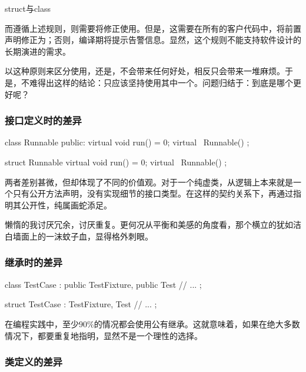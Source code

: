 \begin{content}
\begin{episode}{struct与class}
\begin{content}
\begin{enum}
\end{enum}

而遵循上述规则，则需要将修正使用。但是，这需要在所有的客户代码中，将前置声明修正为；否则，编译期将提示告警信息。显然，这个规则不能支持软件设计的长期演进的需求。

以这种原则来区分使用，还是，不会带来任何好处，相反只会带来一堆麻烦。于是，不难得出这样的结论：只应该坚持使用其中一个。问题归结于：到底是哪个更好呢？

\subsubsection{接口定义时的差异}

\begin{c++}
class Runnable {
public:
  virtual void run() = 0;
  virtual ~Runnable() {}
};

struct Runnable {
  virtual void run() = 0;
  virtual ~Runnable() {}
};
\end{c++}

两者差别甚微，但却体现了不同的价值观。对于一个纯虚类，从逻辑上本来就是一个只有公开方法声明，没有实现细节的接口类型。在这样的契约关系下，再通过指明其公开性，纯属画蛇添足。

懒惰的我讨厌冗余，讨厌重复。更何况从平衡和美感的角度看，那个横立的犹如洁白墙面上的一沫蚊子血，显得格外刺眼。

\subsubsection{继承时的差异}

\begin{c++}
class TestCase : public TestFixture, public Test {
  // ...
};

struct TestCase : TestFixture, Test {
  // ...  
};
\end{c++}

在编程实践中，至少$90\%$的情况都会使用公有继承。这就意味着，如果在绝大多数情况下，都要重复地指明，显然不是一个理性的选择。

\subsubsection{类定义的差异}


\end{content}
\end{episode}
\end{content}
